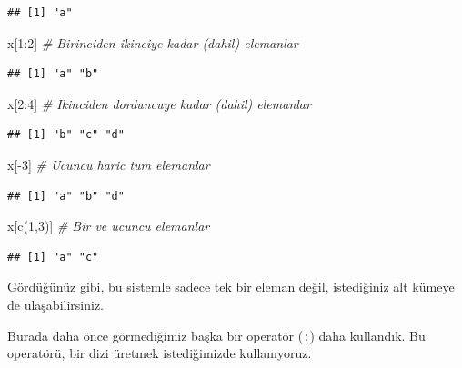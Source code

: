 \documentclass[
]{book}
\newenvironment{Shaded}{\begin{snugshade}}{\end{snugshade}}
\newcommand{\CommentTok}[1]{\textcolor[rgb]{0.56,0.35,0.01}{\textit{#1}}}
\newcommand{\DecValTok}[1]{\textcolor[rgb]{0.00,0.00,0.81}{#1}}
\newcommand{\FunctionTok}[1]{\textcolor[rgb]{0.00,0.00,0.00}{#1}}
\newcommand{\NormalTok}[1]{#1}
\newcommand{\SpecialCharTok}[1]{\textcolor[rgb]{0.00,0.00,0.00}{#1}}
\begin{document}
\begin{verbatim}
## [1] "a"
\end{verbatim}

\begin{Shaded}
\begin{Highlighting}[]
\NormalTok{x[}\DecValTok{1}\SpecialCharTok{:}\DecValTok{2}\NormalTok{] }\CommentTok{\# Birinciden ikinciye kadar (dahil) elemanlar}
\end{Highlighting}
\end{Shaded}

\begin{verbatim}
## [1] "a" "b"
\end{verbatim}

\begin{Shaded}
\begin{Highlighting}[]
\NormalTok{x[}\DecValTok{2}\SpecialCharTok{:}\DecValTok{4}\NormalTok{] }\CommentTok{\# Ikinciden dorduncuye kadar (dahil) elemanlar}
\end{Highlighting}
\end{Shaded}

\begin{verbatim}
## [1] "b" "c" "d"
\end{verbatim}

\begin{Shaded}
\begin{Highlighting}[]
\NormalTok{x[}\SpecialCharTok{{-}}\DecValTok{3}\NormalTok{] }\CommentTok{\# Ucuncu haric tum elemanlar}
\end{Highlighting}
\end{Shaded}

\begin{verbatim}
## [1] "a" "b" "d"
\end{verbatim}

\begin{Shaded}
\begin{Highlighting}[]
\NormalTok{x[}\FunctionTok{c}\NormalTok{(}\DecValTok{1}\NormalTok{,}\DecValTok{3}\NormalTok{)] }\CommentTok{\# Bir ve ucuncu elemanlar}
\end{Highlighting}
\end{Shaded}

\begin{verbatim}
## [1] "a" "c"
\end{verbatim}

Gördüğünüz gibi, bu sistemle sadece tek bir eleman değil, istediğiniz alt kümeye de ulaşabilirsiniz.

Burada daha önce görmediğimiz başka bir operatör (\texttt{:}) daha kullandık. Bu operatörü, bir dizi üretmek istediğimizde kullanıyoruz.
\end{document}
